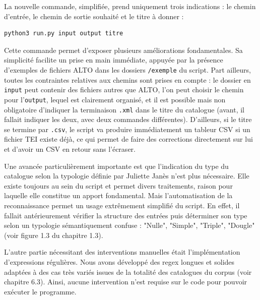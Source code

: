 \documentclass[a4paper,12pt,twoside]{book}
\begin{document}
La nouvelle commande, simplifiée, prend uniquement trois indications : le chemin d'entrée, le chemin de sortie souhaité et le titre à donner : 
\begin{normalsize}
	\begin{verbatim}
python3 run.py input output titre
	\end{verbatim}
\end{normalsize}


Cette commande permet d'exposer plusieurs améliorations fondamentales. Sa simplicité facilite un prise en main immédiate, appuyée par la présence d'exemples de fichiers ALTO dans les dossiers \texttt{/exemple} du script. Part ailleurs, toutes les contraintes relatives aux chemins sont prises en compte : le dossier en \texttt{input} peut contenir des fichiers autres que ALTO, l'on peut choisir le chemin pour l'\texttt{output}, lequel est clairement organisé, et il est possible mais non obligatoire d'indiquer la terminaison \texttt{.xml} dans le titre du catalogue (avant, il fallait indiquer les deux, avec deux commandes différentes). D'ailleurs, si le titre se termine par \texttt{.csv}, le script va produire immédiatement un tableur CSV si un fichier TEI existe déjà, ce qui permet de faire des corrections directement sur lui et d'avoir un CSV en retour sans l'écraser. 

Une avancée particulièrement importante est que l'indication du type du catalogue selon la typologie définie par Juliette Janès n'est plus nécessaire. Elle existe toujours au sein du script et permet divers traitements, raison pour laquelle elle constitue un apport fondamental. Mais l'automatisation de la reconnaissance permet un usage extrêmement simplifié du script. En effet, il fallait antérieurement vérifier la structure des entrées puis déterminer son type selon un typologie sémantiquement confuse : "Nulle", "Simple", "Triple", "Dougle" (voir figure 1.3 du chapitre 1.3).

L'autre partie nécessitant des interventions manuelles était l'implémentation d'expressions régulières. Nous avons développé des regex longues et solides adaptées à des cas très variés issues de la totalité des catalogues du corpus (voir chapitre 6.3). Ainsi, aucune intervention n'est requise sur le code pour pouvoir exécuter le programme.
\end{document}
